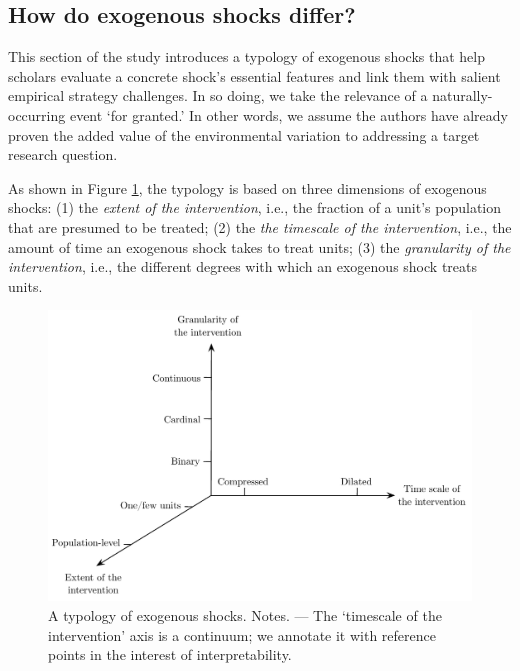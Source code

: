 \documentclass[11pt]{article}
\begin{document}
\begin{refsection}
\section{How do exogenous shocks differ?}
\label{sec:how_exogenous_shocks_differ}

\noindent This section of the study introduces a typology of exogenous shocks that
help scholars evaluate a concrete shock's essential features and link them with
salient empirical strategy challenges. In so doing, we take the relevance of a
naturally-occurring event `for granted.' In other words, we assume the authors
have already proven the added value of the environmental variation to addressing
a target research question.

As shown in Figure \ref{fig:typology}, the typology is based on three dimensions
of exogenous shocks: (1) the \textit{extent of the intervention}, i.e., the 
fraction of a unit's population that are presumed to be treated; (2) the
\textit{the timescale of the intervention}, i.e., the amount of time an
exogenous shock takes to treat units; (3) the \textit{granularity of the 
intervention}, i.e., the different degrees with which an exogenous shock treats
units. 

\begin{figure}[!htbp]
    \begin{center}
      \includegraphics[width=1\textwidth]{exhibits/typology.pdf}
    \end{center}
    \caption{A typology of exogenous shocks. Notes. --- The `timescale of the 
    intervention' axis is a continuum; we annotate it with reference points
    in the interest of interpretability. }
    \label{fig:typology}
\end{figure}


\end{refsection}
\end{document}
